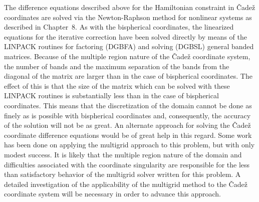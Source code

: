 The difference equations described above for the Hamiltonian constraint in
\v{C}ade\v{z} coordinates are solved via the Newton-Raphson method for
nonlinear systems as described in Chapter~8.  As with the bispherical
coordinates, the linearized equations for the iterative correction have been
solved directly by means of the LINPACK routines for factoring (DGBFA) and
solving (DGBSL) general banded matrices.  Because of the multiple region nature
of the \v{C}ade\v{z} coordinate system, the number of bands and the maximum
separation of the bands from the diagonal of the matrix are larger than in the
case of bispherical coordinates.  The effect of this is that the size of the
matrix which can be solved with these LINPACK routines is substantially less
than in the case of bispherical coordinates.  This means that the discretization
of the domain cannot be done as finely as is possible with bispherical
coordinates and, consequently, the accuracy of the solution will not be as
great.  An alternate approach for solving the \v{C}ade\v{z} coordinate
difference equations would be of great help in this regard.  Some work has been
done on applying the multigrid approach to this problem, but with only modest
success.  It is likely that the multiple region nature of the domain and
difficulties associated with the coordinate singularity are responsible for the
less than satisfactory behavior of the multigrid solver written for this
problem.  A detailed investigation of the applicability of the multigrid method
to the \v{C}ade\v{z} coordinate system will be necessary in order to advance
this approach.

